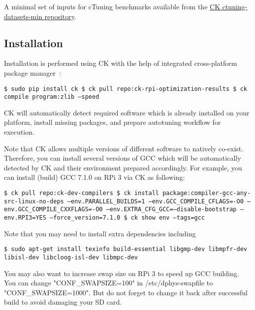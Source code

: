 A minimal set of inputs for cTuning benchmarks available from the \href{https://github.com/ctuning/ctuning-datasets-min}{CK ctuning-datasets-min repository}.

\subsection{Installation}

Installation is performed using CK with the help of integrated cross-platform package manager~\cite{ck-env}:

\begin{flushleft}
\texttt{\$ sudo pip install ck \newline
\$ ck pull repo:ck-rpi-optimization-results \newline
\$ ck compile program:zlib --speed \newline}
\end{flushleft}

CK will automatically detect required software which is already installed on your platform, 
install missing packages, and prepare autotuning workflow for execution.

Note that CK allows multiple versions of different software to natively co-exist.
%
Therefore, you can install several versions of GCC which will be automatically
detected by CK and their environment prepared accordingly.
%
For example, you can install (build) GCC 7.1.0 on RPi 3 via CK as following:

\begin{flushleft}
\texttt{\$ ck pull repo:ck-dev-compilers \newline
\$ ck install package:compiler-gcc-any-src-linux-no-deps --env.PARALLEL\_BUILDS=1 --env.GCC\_COMPILE\_CFLAGS=-O0 --env.GCC\_COMPILE\_CXXFLAGS=-O0 --env.EXTRA\_CFG\_GCC=--disable-bootstrap --env.RPI3=YES --force\_version=7.1.0 \newline
\$ ck show env --tags=gcc}
\end{flushleft}

Note that you may need to install extra dependencies including

\begin{flushleft}
\texttt{\$ sudo apt-get install texinfo build-essential libgmp-dev libmpfr-dev libisl-dev libcloog-isl-dev libmpc-dev}
\end{flushleft}

You may also want to increase swap size on RPi 3 to speed up GCC building. 
You can change "CONF\_SWAPSIZE=100" in /etc/dphys-swapfile to "CONF\_SWAPSIZE=1000". 
But do not forget to change it back after successful build to avoid damaging your SD card.

